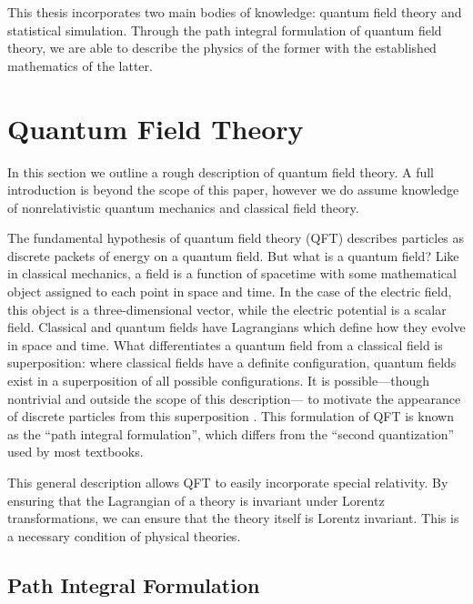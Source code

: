 This thesis incorporates two main bodies of knowledge: quantum field theory and statistical simulation. Through the path integral formulation of quantum field theory, we are able to describe the physics of the former with the established mathematics of the latter.

\section{Quantum Field Theory}


In this section we outline a rough description of quantum field theory. A full introduction is beyond the scope of this paper, however we do assume knowledge of nonrelativistic quantum mechanics and classical field theory.

The fundamental hypothesis of quantum field theory (QFT) describes particles as discrete packets of energy on a quantum field. But what is a quantum field? Like in classical mechanics, a field is a function of spacetime with some mathematical object assigned to each point in space and time. In the case of the electric field, this object is a three-dimensional vector, while the electric potential is a scalar field. Classical and quantum fields have Lagrangians which define how they evolve in space and time. What differentiates a quantum field from a classical field is superposition: where classical fields have a definite configuration, quantum fields exist in a superposition of all possible configurations. It is possible---though nontrivial and outside the scope of this description--- to motivate the appearance of discrete particles from this superposition \cite{zee2010}. This formulation of QFT is known as the ``path integral formulation'', which differs from the ``second quantization'' used by most textbooks.

This general description allows QFT to easily incorporate special relativity. By ensuring that the Lagrangian of a theory is invariant under Lorentz transformations, we can ensure that the theory itself is Lorentz invariant. This is a necessary condition of physical theories. 

 
\subsection{Path Integral Formulation}
\label{sec:pathintegral}

